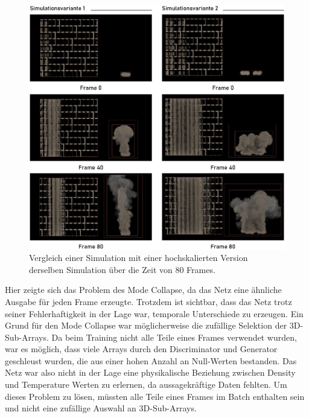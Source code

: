 \begin{figure}[ht]
    \centering
    \includegraphics[width=13cm]{bilder/2_scaled_sims2.jpg}
    \caption{Vergleich einer Simulation mit einer hochskalierten Version derselben Simulation über die Zeit von 80 Frames.}
    \label{2scaled}
\end{figure}
Hier zeigte sich das Problem des Mode Collapse, da das Netz eine ähnliche Ausgabe für jeden Frame erzeugte. Trotzdem ist sichtbar, dass das Netz trotz seiner Fehlerhaftigkeit in der Lage war, temporale Unterschiede zu erzeugen. Ein Grund für den Mode Collapse war möglicherweise die zufällige Selektion der 3D-Sub-Arrays. Da beim Training nicht alle Teile eines Frames verwendet wurden, war es möglich, dass viele Arrays durch den Discriminator und Generator geschleust wurden, die aus einer hohen Anzahl an Null-Werten bestanden. Das Netz war also nicht in der Lage eine physikalische Beziehung zwischen Density und Temperature Werten zu erlernen, da aussagekräftige Daten fehlten. Um dieses Problem zu lösen, müssten alle Teile eines Frames im Batch enthalten sein und nicht eine zufällige Auswahl an 3D-Sub-Arrays.\\

